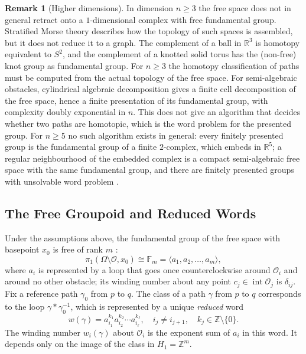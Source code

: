 \documentclass[11pt,reqno]{amsart}
\theoremstyle{definition}
\newtheorem{remark}[theorem]{Remark}
\providecommand{\R}{\mathbb{R}}
\newcommand{\Z}{\mathbb{Z}}
\numberwithin{equation}{section}
\providecommand{\R}{\mathbb{R}}
\begin{document}
\begin{remark}[Higher dimensions]
In dimension $n \ge 3$ the free space does not in general retract onto a $1$-dimensional complex with free fundamental group. Stratified Morse theory \cite{goresky1988} describes how the topology of such spaces is assembled, but it does not reduce it to a graph. The complement of a ball in $\R^3$ is homotopy equivalent to $S^2$, and the complement of a knotted solid torus has the (non-free) knot group as fundamental group. For $n \ge 3$ the homotopy classification of paths must be computed from the actual topology of the free space. For semi-algebraic obstacles, cylindrical algebraic decomposition gives a finite cell decomposition of the free space, hence a finite presentation of its fundamental group, with complexity doubly exponential in $n$. This does not give an algorithm that decides whether two paths are homotopic, which is the word problem for the presented group. For $n \ge 5$ no such algorithm exists in general: every finitely presented group is the fundamental group of a finite $2$-complex, which embeds in $\R^5$; a regular neighbourhood of the embedded complex is a compact semi-algebraic free space with the same fundamental group, and there are finitely presented groups with unsolvable word problem \cite{boone1959}.
\end{remark}

\subsection{The Free Groupoid and Reduced Words}
Under the assumptions above, the fundamental group of the free space with basepoint $x_0$ is free of rank $m$ \cite{hatcher2002}:
\begin{equation}
\pi_1(\Omega \setminus \mathcal{O}, x_0) \cong \mathbb{F}_m = \langle a_1, a_2, \dots, a_m \rangle,
\end{equation}
where $a_i$ is represented by a loop that goes once counterclockwise around $\mathcal{O}_i$ and around no other obstacle; its winding number about any point $c_j \in \operatorname{int}\mathcal{O}_j$ is $\delta_{ij}$. Fix a reference path $\gamma_0$ from $p$ to $q$. The class of a path $\gamma$ from $p$ to $q$ corresponds to the loop $\gamma * \gamma_0^{-1}$, which is represented by a unique \emph{reduced} word
\begin{equation}
w(\gamma) = a_{i_1}^{k_1} a_{i_2}^{k_2} \cdots a_{i_\ell}^{k_\ell}, \quad i_j \neq i_{j+1}, \quad k_j \in \Z \setminus \{0\}.
\end{equation}
The winding number $w_i(\gamma)$ about $\mathcal{O}_i$ is the exponent sum of $a_i$ in this word. It depends only on the image of the class in $H_1 = \Z^m$.
\end{document}
